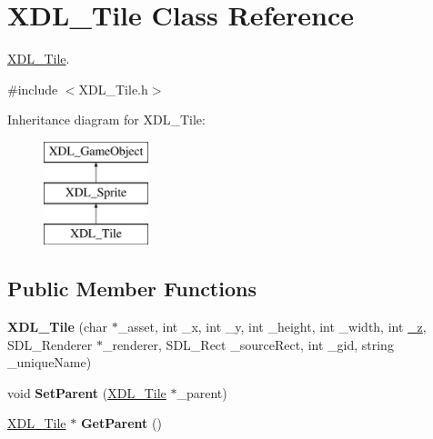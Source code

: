 \hypertarget{class_x_d_l___tile}{\section{X\-D\-L\-\_\-\-Tile Class Reference}
\label{class_x_d_l___tile}
}


\hyperlink{class_x_d_l___tile}{X\-D\-L\-\_\-\-Tile}.  




{\ttfamily \#include $<$X\-D\-L\-\_\-\-Tile.\-h$>$}

Inheritance diagram for X\-D\-L\-\_\-\-Tile\-:\begin{figure}[H]
\begin{center}
\leavevmode
\includegraphics[height=3.000000cm]{class_x_d_l___tile}
\end{center}
\end{figure}
\subsection*{Public Member Functions}
\begin{DoxyCompactItemize}
\item 
\hypertarget{class_x_d_l___tile_a785bc26dfa323626361fb0ca16051f71}{{\bfseries X\-D\-L\-\_\-\-Tile} (char $\ast$\-\_\-asset, int \-\_\-x, int \-\_\-y, int \-\_\-height, int \-\_\-width, int \hyperlink{class_x_d_l___game_object_a62a08106992c783507c669f71a6dd6a6}{\-\_\-z}, S\-D\-L\-\_\-\-Renderer $\ast$\-\_\-renderer, S\-D\-L\-\_\-\-Rect \-\_\-source\-Rect, int \-\_\-gid, string \-\_\-unique\-Name)}\label{class_x_d_l___tile_a785bc26dfa323626361fb0ca16051f71}

\item 
\hypertarget{class_x_d_l___tile_ac520d114e26b99eea8762516a9e4fc0b}{void {\bfseries Set\-Parent} (\hyperlink{class_x_d_l___tile}{X\-D\-L\-\_\-\-Tile} $\ast$\-\_\-parent)}\label{class_x_d_l___tile_ac520d114e26b99eea8762516a9e4fc0b}

\item 
\hypertarget{class_x_d_l___tile_a7000f395eee7999beffead93d979a83e}{\hyperlink{class_x_d_l___tile}{X\-D\-L\-\_\-\-Tile} $\ast$ {\bfseries Get\-Parent} ()}\label{class_x_d_l___tile_a7000f395eee7999beffead93d979a83e}

\end{DoxyCompactItemize}
